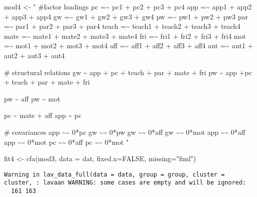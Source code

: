 \documentclass[
  letterpaper,
  DIV=11,
  numbers=noendperiod]{scrartcl}
\newenvironment{Shaded}{\begin{snugshade}}{\end{snugshade}}
\newcommand{\AttributeTok}[1]{\textcolor[rgb]{0.40,0.45,0.13}{#1}}
\newcommand{\ConstantTok}[1]{\textcolor[rgb]{0.56,0.35,0.01}{#1}}
\newcommand{\FunctionTok}[1]{\textcolor[rgb]{0.28,0.35,0.67}{#1}}
\newcommand{\NormalTok}[1]{\textcolor[rgb]{0.00,0.23,0.31}{#1}}
\newcommand{\OtherTok}[1]{\textcolor[rgb]{0.00,0.23,0.31}{#1}}
\newcommand{\StringTok}[1]{\textcolor[rgb]{0.13,0.47,0.30}{#1}}
\begin{document}
\begin{Shaded}
\begin{Highlighting}[]
\NormalTok{mod4 }\OtherTok{\textless{}{-}} \StringTok{"}
\StringTok{\#factor loadings}
\StringTok{pc =\textasciitilde{} pc1 + pc2 + pc3 + pc4}
\StringTok{app =\textasciitilde{} app1 + app2 + app3 + app4}
\StringTok{gw =\textasciitilde{} gw1 + gw2 + gw3 + gw4}
\StringTok{pw =\textasciitilde{} pw1 + pw2 + pw3}
\StringTok{par =\textasciitilde{} par1 + par2 + par3 + par4}
\StringTok{teach =\textasciitilde{} teach1 + teach2 + teach3 + teach4}
\StringTok{mate =\textasciitilde{} mate1 + mate2 + mate3 + mate4}
\StringTok{fri =\textasciitilde{} fri1 + fri2 + fri3 + fri4}
\StringTok{mot =\textasciitilde{} mot1 + mot2 + mot3 + mot4}
\StringTok{aff =\textasciitilde{} aff1 + aff2 + aff3 + aff4}
\StringTok{aut =\textasciitilde{} aut1 + aut2 + aut3 + aut4}

\StringTok{\# structural relations}
\StringTok{gw \textasciitilde{} app + pc + teach + par + mate + fri}
\StringTok{pw \textasciitilde{} app +pc + teach + par + mate + fri}

\StringTok{pw \textasciitilde{} aff}
\StringTok{pw \textasciitilde{} mot}

\StringTok{pc \textasciitilde{} mate + aff}
\StringTok{app \textasciitilde{} pc}

\StringTok{\# covariances}
\StringTok{app \textasciitilde{}\textasciitilde{} 0*pc}
\StringTok{gw \textasciitilde{}\textasciitilde{} 0*pw}
\StringTok{gw \textasciitilde{}\textasciitilde{} 0*aff}
\StringTok{gw \textasciitilde{}\textasciitilde{} 0*mot}
\StringTok{app \textasciitilde{}\textasciitilde{} 0*aff}
\StringTok{app \textasciitilde{}\textasciitilde{} 0*mot}
\StringTok{pc \textasciitilde{}\textasciitilde{} 0*aff}
\StringTok{pc \textasciitilde{}\textasciitilde{} 0*mot}
\StringTok{"}
\end{Highlighting}
\end{Shaded}

\begin{Shaded}
\begin{Highlighting}[]
\NormalTok{fit4 }\OtherTok{\textless{}{-}} \FunctionTok{cfa}\NormalTok{(mod3, }\AttributeTok{data =}\NormalTok{ dat, }\AttributeTok{fixed.x=}\ConstantTok{FALSE}\NormalTok{, }\AttributeTok{missing=}\StringTok{"fiml"}\NormalTok{)}
\end{Highlighting}
\end{Shaded}

\begin{verbatim}
Warning in lav_data_full(data = data, group = group, cluster = cluster, : lavaan WARNING: some cases are empty and will be ignored:
  161 163
\end{verbatim}
\end{document}
